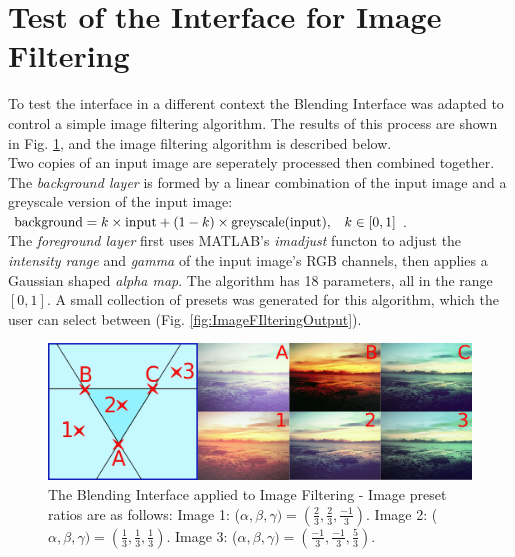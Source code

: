 \documentclass[11pt, oneside]{report}   	%
\begin{document}
\section{Test of the Interface for Image Filtering}\label{sec:ImageEditing}
To test the interface in a different context the Blending Interface was adapted to control a simple image filtering algorithm. The results of this process are shown in Fig. \ref{fig:ImageFIltering}, and the image filtering algorithm is described below.\\
Two copies of an input image are seperately processed then combined together. The \emph{background layer} is formed by a linear combination of the input image and a greyscale version of the input image:	$\mathrm{background} = k \times \mathrm{input} + (1-k) \times \mathrm{greyscale}(\mathrm{input}), \hspace{0.3cm} k \in [0, 1] $.\\
 The \emph{foreground layer} first uses MATLAB's \emph{imadjust} functon \cite{Imadjust} to adjust the \emph{intensity range} and \emph{gamma} of the input image's RGB channels, then applies a Gaussian shaped \emph{alpha map}. The algorithm has 18 parameters, all in the range $[0,1]$. A small collection of presets was generated for this algorithm, which the user can select between (Fig. \ref{fig:ImageFIlteringOutput}).
\begin{figure}[h]
	\hspace{-30pt}
	\includegraphics[width = 7in]{ImageBlendingLocations.png}
	\caption{The Blending Interface applied to Image Filtering - Image preset ratios are as follows: Image 1: ($\alpha, \beta, \gamma)=(\frac{2}{3}, \frac{2}{3}, \frac{-1}{3})$. Image 2: ($\alpha, \beta, \gamma)=(\frac{1}{3}, \frac{1}{3}, \frac{1}{3})$. Image 3: ($\alpha, \beta, \gamma)=(\frac{-1}{3}, \frac{-1}{3}, \frac{5}{3})$.}
	\label{fig:ImageFIltering}
	\vspace{-20pt}
\end{figure}
\end{document}
